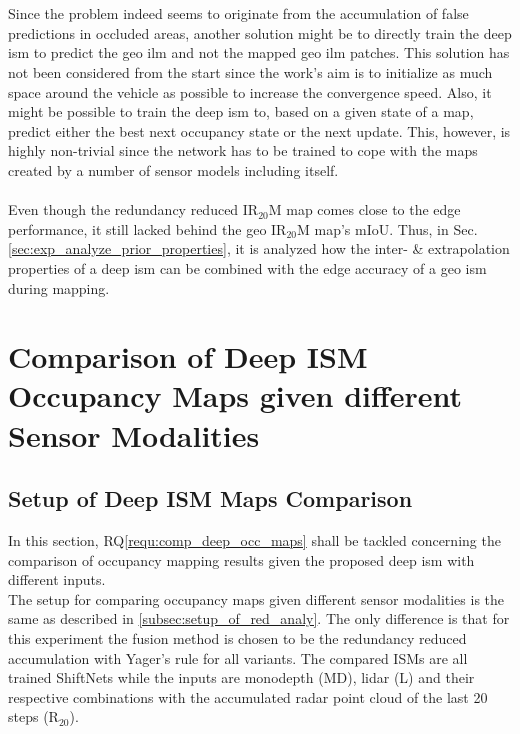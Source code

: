 \\\\
Since the problem indeed seems to originate from the accumulation of false predictions in occluded areas, another solution might be to directly train the deep \gls{ism} to predict the geo \gls{ilm} and not the mapped geo \gls{ilm} patches. This solution has not been considered from the start since the work's aim is to initialize as much space around the vehicle as possible to increase the convergence speed. Also, it might be possible to train the deep \gls{ism} to, based on a given state of a map, predict either the best next occupancy state or the next update. This, however, is highly non-trivial since the network has to be trained to cope with the maps created by a number of sensor models including itself. 
\\\\
Even though the redundancy reduced IR$_{20}$M map comes close to the edge performance, it still lacked behind the geo IR$_{20}$M map's mIoU. Thus, in Sec. \ref{sec:exp_analyze_prior_properties}, it is analyzed how the inter- \& extrapolation properties of a deep \gls{ism} can be combined with the edge accuracy of a geo \gls{ism} during mapping.
%
\section{Comparison of Deep ISM Occupancy Maps given different Sensor Modalities}
\label{sec:exp_comparison_deep_ism_maps_diff_sensors}
%
\subsection{Setup of Deep ISM Maps Comparison}
\label{subsec:setup_analyze_deep_ism_maps_diff_sensors}
In this section, RQ\ref{requ:comp_deep_occ_maps} shall be tackled concerning the comparison of occupancy mapping results given the proposed deep \gls{ism} with different inputs.\\
The setup for comparing occupancy maps given different sensor modalities is the same as described in \ref{subsec:setup_of_red_analy}. The only difference is that for this experiment the fusion method is chosen to be the redundancy reduced accumulation with Yager's rule for all variants. The compared ISMs are all trained ShiftNets while the inputs are \gls{monodepth} (MD), lidar (L) and their respective combinations with the accumulated radar point cloud of the last 20 steps (R$_{20}$). 
%
